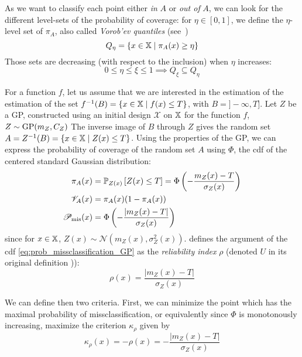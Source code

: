 \documentclass[../../Main_ManuscritThese.tex]{subfiles}
\begin{document}
As we want to classify each point either \emph{in} $A$ or \emph{out of} $A$, we can look for the different level-sets of the probability of coverage: for $\eta \in [0, 1]$, we define the $\eta$-level set of $\pi_A$, also called \emph{Vorob'ev quantiles} (see~\cite{vorobyev_new_2003})
\begin{equation}
  Q_{\eta} = \{x\in\mathbb{X} \mid \pi_A(x) \geq \eta \}
\end{equation}
Those sets are decreasing (with respect to the inclusion) when $\eta$ increases:
\begin{equation}
  0\leq \eta \leq \xi \leq 1 \implies Q_{\xi} \subseteq Q_{\eta}
\end{equation}

For a function $f$, let us assume that we are interested in the estimation of the estimation of the set $f^{-1}(B) = \{x \in \mathbb{X} \mid f(x) \leq T\}$, with  $B = ]-\infty, T]$.
Let $Z$ be a GP, constructed using an initial design $\mathcal{X}$ on $\mathbb{X}$ for the function $f$, $Z\sim \operatorname{\mathrm{GP}}(m_Z, C_Z)$
The inverse image of $B$ through $Z$ gives the random set $A = Z^{-1}(B) = \{x \in \mathbb{X} \mid Z(x) \leq T\}$.
Using the properties of the GP, we can express the probability of coverage of the random set $A$ using $\Phi$, the cdf of the centered standard Gaussian distribution:
\begin{align}
  \pi_A(x) &= \mathbb{P}_{Z(x)}\left[Z(x) \leq T\right] = \Phi\left(-\frac{m_Z(x) - T}{\sigma_Z(x)}\right) \\
  \mathscr{V}_A(x) &= \pi_A(x)(1 - \pi_A(x)) \\
  \mathscr{P}_{\mathrm{mis}}(x) &= \Phi\left(- \frac{\lvert m_Z(x) - T \rvert}{\sigma_Z(x)} \right) \label{eq:prob_missclassification_GP}
\end{align}
since for $x\in\mathbb{X}$, $Z(x)\sim\mathcal{N}\left(m_Z(x), \sigma^2_Z(x)\right)$.
\cite{echard_ak-mcs_2011} defines the argument of the cdf \cref{eq:prob_missclassification_GP} as the \emph{reliability index} $\rho$ (denoted $U$ in its original definition \cite{echard_ak-mcs_2011})):
\begin{equation}
  \rho(x) = \frac{\lvert m_Z(x) - T \rvert}{\sigma_Z(x)}
\end{equation}

We can define then two criteria. First, we can minimize the point which has the maximal probability of missclassification, or equivalently since $\Phi$ is monotonously increasing, maximize the criterion $\kappa_{\rho}$ given by
\begin{equation}
  \kappa_{\rho}(x) = -\rho(x) = -\frac{\lvert m_Z(x) - T \rvert}{\sigma_Z(x)}
\end{equation}
\end{document}
